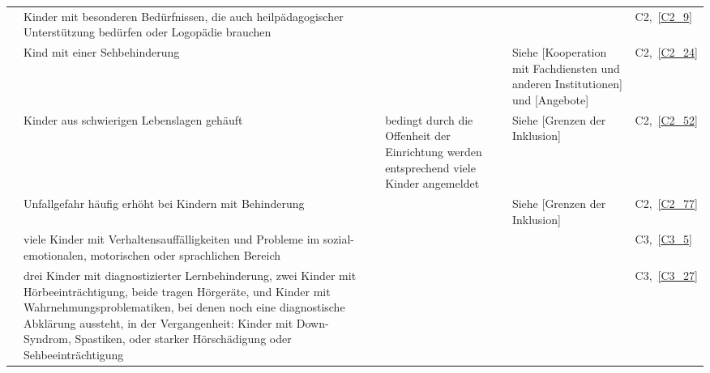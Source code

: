 \begin{landscape}
\begin{small}
\begin{centering}
\begin{longtable}{p{2cm}p{8.5cm}p{4cm}p{4cm}p{1.5cm}}
\cmidrule{2 - 5}
& Kinder mit besonderen Bedürfnissen, die auch heilpädagogischer Unterstützung bedürfen oder Logopädie brauchen & & & C2,~\ref{C2_9}\\
\cmidrule{2 - 5}
& Kind mit einer Sehbehinderung & & Siehe [Kooperation mit Fachdiensten und anderen Institutionen] und [Angebote] & C2,~\ref{C2_24}\\
\cmidrule{2 - 5}
& Kinder aus schwierigen Lebenslagen gehäuft & bedingt durch die Offenheit der Einrichtung werden entsprechend viele Kinder angemeldet & Siehe [Grenzen der Inklusion] & C2,~\ref{C2_52}\\ 
\cmidrule{2 - 5}
& Unfallgefahr häufig erhöht bei Kindern mit Behinderung & & Siehe [Grenzen der Inklusion] & C2,~\ref{C2_77}\\ 
\cmidrule{2 - 5}
& viele Kinder mit Verhaltensauffälligkeiten und Probleme im sozial-emotionalen, motorischen oder sprachlichen Bereich & & & C3,~\ref{C3_5}\\
\cmidrule{2 - 5}
& drei Kinder mit diagnostizierter Lernbehinderung, zwei Kinder mit Hörbeeinträchtigung, beide tragen Hörgeräte, und Kinder mit Wahrnehmungsproblematiken, bei denen noch eine diagnostische Abklärung aussteht, in der Vergangenheit: Kinder mit Down-Syndrom, Spastiken, oder starker Hörschädigung oder Sehbeeinträchtigung & & & C3,~\ref{C3_27}\\


\end{longtable}
\end{centering}
\end{small}
\end{landscape}
